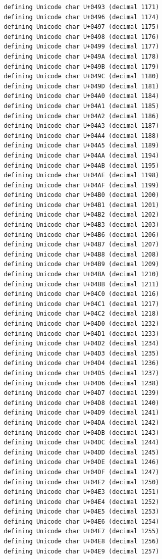 \documentclass{article}
\begin{document}
\begin{verbatim}
   defining Unicode char U+0493 (decimal 1171)
   defining Unicode char U+0496 (decimal 1174)
   defining Unicode char U+0497 (decimal 1175)
   defining Unicode char U+0498 (decimal 1176)
   defining Unicode char U+0499 (decimal 1177)
   defining Unicode char U+049A (decimal 1178)
   defining Unicode char U+049B (decimal 1179)
   defining Unicode char U+049C (decimal 1180)
   defining Unicode char U+049D (decimal 1181)
   defining Unicode char U+04A0 (decimal 1184)
   defining Unicode char U+04A1 (decimal 1185)
   defining Unicode char U+04A2 (decimal 1186)
   defining Unicode char U+04A3 (decimal 1187)
   defining Unicode char U+04A4 (decimal 1188)
   defining Unicode char U+04A5 (decimal 1189)
   defining Unicode char U+04AA (decimal 1194)
   defining Unicode char U+04AB (decimal 1195)
   defining Unicode char U+04AE (decimal 1198)
   defining Unicode char U+04AF (decimal 1199)
   defining Unicode char U+04B0 (decimal 1200)
   defining Unicode char U+04B1 (decimal 1201)
   defining Unicode char U+04B2 (decimal 1202)
   defining Unicode char U+04B3 (decimal 1203)
   defining Unicode char U+04B6 (decimal 1206)
   defining Unicode char U+04B7 (decimal 1207)
   defining Unicode char U+04B8 (decimal 1208)
   defining Unicode char U+04B9 (decimal 1209)
   defining Unicode char U+04BA (decimal 1210)
   defining Unicode char U+04BB (decimal 1211)
   defining Unicode char U+04C0 (decimal 1216)
   defining Unicode char U+04C1 (decimal 1217)
   defining Unicode char U+04C2 (decimal 1218)
   defining Unicode char U+04D0 (decimal 1232)
   defining Unicode char U+04D1 (decimal 1233)
   defining Unicode char U+04D2 (decimal 1234)
   defining Unicode char U+04D3 (decimal 1235)
   defining Unicode char U+04D4 (decimal 1236)
   defining Unicode char U+04D5 (decimal 1237)
   defining Unicode char U+04D6 (decimal 1238)
   defining Unicode char U+04D7 (decimal 1239)
   defining Unicode char U+04D8 (decimal 1240)
   defining Unicode char U+04D9 (decimal 1241)
   defining Unicode char U+04DA (decimal 1242)
   defining Unicode char U+04DB (decimal 1243)
   defining Unicode char U+04DC (decimal 1244)
   defining Unicode char U+04DD (decimal 1245)
   defining Unicode char U+04DE (decimal 1246)
   defining Unicode char U+04DF (decimal 1247)
   defining Unicode char U+04E2 (decimal 1250)
   defining Unicode char U+04E3 (decimal 1251)
   defining Unicode char U+04E4 (decimal 1252)
   defining Unicode char U+04E5 (decimal 1253)
   defining Unicode char U+04E6 (decimal 1254)
   defining Unicode char U+04E7 (decimal 1255)
   defining Unicode char U+04E8 (decimal 1256)
   defining Unicode char U+04E9 (decimal 1257)

\end{verbatim}
\end{document}
